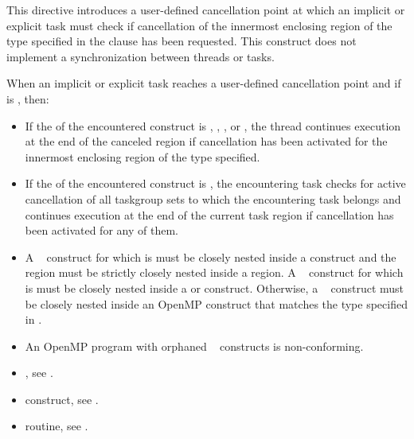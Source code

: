 \descr
This directive introduces a user-defined cancellation point at which an implicit or 
explicit task must check if cancellation of the innermost enclosing region of the type 
specified in the clause has been requested. This construct does not implement a 
synchronization between threads or tasks.

When an implicit or explicit task reaches a user-defined cancellation point and if 
 is , then:
\begin{itemize}
\item If the  of the encountered  construct is , , , or ,
the thread continues execution at the end of the canceled region if 
cancellation has been activated for the innermost enclosing region of 
the type specified.

\item If the  of the encountered 
 construct is , the encountering 
task checks for active cancellation of all taskgroup sets to which the 
encountering task belongs and continues execution at the end of the current 
task region if cancellation has been activated for any of them.
\end{itemize}

\restrictions
\begin{itemize}
\item A ~ construct for which
 is  must be closely nested
inside a  construct and the ~
region must be strictly closely nested inside a  region. A
~ construct for which
 is  must be closely nested
inside a  or  construct. Otherwise, a
~ construct must be closely nested inside
an OpenMP construct that matches the type specified in
.

\item An OpenMP program with orphaned ~ constructs is 
non-conforming. 
\end{itemize}

\begin{samepage}
\crossreferences
\begin{itemize}
\item {}, see 
.

\item {} construct, see 
.

\item {} routine, see 
.
\end{itemize}
\end{samepage}









